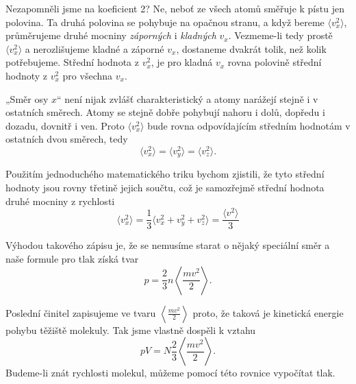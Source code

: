    Nezapomněli jsme na koeficient 2? Ne, neboť ze všech atomů směřuje k pístu jen polovina. Ta
    druhá polovina se pohybuje na opačnou stranu, a když bereme \(\langle v^2_x\rangle\),
    průměrujeme druhé mocniny \emph{záporných} i \emph{kladných} \(v_x\). Vezmeme-li tedy prostě
    \(\langle v^2_x\rangle\) a nerozlišujeme kladné a záporné \(v_x\), dostaneme dvakrát tolik, než
    kolik potřebujeme. Střední hodnota z \(v_x^2\), je pro kladná \(v_x\) rovna polovině střední
    hodnoty z \(v_x^2\) pro všechna \(v_x\).

    „Směr osy \(x\)“ není nijak zvlášť charakteristický a atomy narážejí stejně i v ostatních
    směrech. Atomy se stejně dobře pohybují nahoru i dolů, dopředu i dozadu, dovnitř i ven. Proto
    \(\langle v^2_x\rangle\) bude rovna odpovídajícím středním hodnotám v ostatních dvou směrech,
    tedy
    \begin{equation}\label{fyz:eq617}
      \langle v^2_x \rangle = \langle v^2_y \rangle = \langle v^2_z\rangle.
    \end{equation}

    Použitím jednoduchého matematického triku bychom zjistili, že tyto střední hodnoty jsou rovny
    třetině jejich součtu, což je samozřejmě střední hodnota druhé mocniny z rychlosti
    \begin{equation}\label{fyz:eq618}
      \langle v^2_x\rangle = \frac{1}{3}\langle v^2_x+v^2_y+v^2_z\rangle 
                          = \frac{\langle v^2\rangle}{3}
    \end{equation}

    Výhodou takového zápisu je, že se nemusíme starat o nějaký speciální směr a naše formule pro
    tlak získá tvar
    \begin{equation}\label{fyz:eq619}
      p = \frac{2}{3}n\left\langle\frac{mv^2}{2}\right\rangle.
    \end{equation}

    Poslední činitel zapisujeme ve tvaru \(\left\langle\frac{mv^2}{2}\right\rangle\) proto, že
    taková je kinetická energie pohybu těžiště molekuly. Tak jsme vlastně dospěli k vztahu
    \begin{equation}\label{fyz:eq620}
      pV = N\frac{2}{3}\left\langle\frac{mv^2}{2}\right\rangle.
    \end{equation}
    Budeme-li znát rychlosti molekul, můžeme pomocí této rovnice vypočítat tlak.

